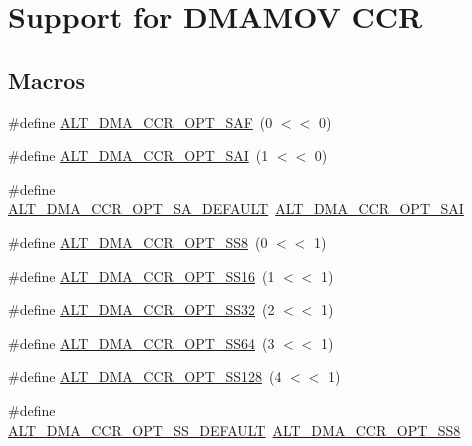 \hypertarget{group__DMA__CCR}{}\section{Support for D\+M\+A\+M\+OV C\+CR}
\label{group__DMA__CCR}
\subsection*{Macros}
\begin{DoxyCompactItemize}
\item 
\#define \mbox{\hyperlink{group__DMA__CCR_gaa1f554ac008825493a3a3199edd44df8}{A\+L\+T\+\_\+\+D\+M\+A\+\_\+\+C\+C\+R\+\_\+\+O\+P\+T\+\_\+\+S\+AF}}~(0 $<$$<$ 0)
\item 
\#define \mbox{\hyperlink{group__DMA__CCR_ga5d523923d52b713bd2c7aef71dbf0961}{A\+L\+T\+\_\+\+D\+M\+A\+\_\+\+C\+C\+R\+\_\+\+O\+P\+T\+\_\+\+S\+AI}}~(1 $<$$<$ 0)
\item 
\#define \mbox{\hyperlink{group__DMA__CCR_gae8de6537bee0d44b1e0be68c3323e4af}{A\+L\+T\+\_\+\+D\+M\+A\+\_\+\+C\+C\+R\+\_\+\+O\+P\+T\+\_\+\+S\+A\+\_\+\+D\+E\+F\+A\+U\+LT}}~\mbox{\hyperlink{group__DMA__CCR_ga5d523923d52b713bd2c7aef71dbf0961}{A\+L\+T\+\_\+\+D\+M\+A\+\_\+\+C\+C\+R\+\_\+\+O\+P\+T\+\_\+\+S\+AI}}
\item 
\#define \mbox{\hyperlink{group__DMA__CCR_gafe43a067021bf80292cb0f570469b287}{A\+L\+T\+\_\+\+D\+M\+A\+\_\+\+C\+C\+R\+\_\+\+O\+P\+T\+\_\+\+S\+S8}}~(0 $<$$<$ 1)
\item 
\#define \mbox{\hyperlink{group__DMA__CCR_gace559e11477ea12cfed3ff1559ed8c0f}{A\+L\+T\+\_\+\+D\+M\+A\+\_\+\+C\+C\+R\+\_\+\+O\+P\+T\+\_\+\+S\+S16}}~(1 $<$$<$ 1)
\item 
\#define \mbox{\hyperlink{group__DMA__CCR_ga3778fd14b4c3bb8d19e81b842a75f85a}{A\+L\+T\+\_\+\+D\+M\+A\+\_\+\+C\+C\+R\+\_\+\+O\+P\+T\+\_\+\+S\+S32}}~(2 $<$$<$ 1)
\item 
\#define \mbox{\hyperlink{group__DMA__CCR_ga420672e065060e5d736cc95644838f5b}{A\+L\+T\+\_\+\+D\+M\+A\+\_\+\+C\+C\+R\+\_\+\+O\+P\+T\+\_\+\+S\+S64}}~(3 $<$$<$ 1)
\item 
\#define \mbox{\hyperlink{group__DMA__CCR_gacd4763214c223c08d05c473feb165648}{A\+L\+T\+\_\+\+D\+M\+A\+\_\+\+C\+C\+R\+\_\+\+O\+P\+T\+\_\+\+S\+S128}}~(4 $<$$<$ 1)
\item 
\#define \mbox{\hyperlink{group__DMA__CCR_ga93aa54e1de236059bd46c307f9f32003}{A\+L\+T\+\_\+\+D\+M\+A\+\_\+\+C\+C\+R\+\_\+\+O\+P\+T\+\_\+\+S\+S\+\_\+\+D\+E\+F\+A\+U\+LT}}~\mbox{\hyperlink{group__DMA__CCR_gafe43a067021bf80292cb0f570469b287}{A\+L\+T\+\_\+\+D\+M\+A\+\_\+\+C\+C\+R\+\_\+\+O\+P\+T\+\_\+\+S\+S8}}
$$
\end{DoxyCompactItemize}
